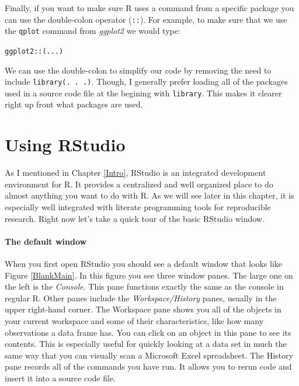 \documentclass[krantz1]{krantz}
\begin{document}
Finally, if you want to make sure R uses a command from a specific package you can use the double-colon operator (\verb|::|). For example, to make sure that we use the \texttt{qplot} command from \emph{ggplot2} we would type:

\begin{knitrout}
\color{fgcolor}\begin{kframe}
\begin{alltt}
ggplot2::(. . .)
\end{alltt}
\end{kframe}
\end{knitrout}


\noindent We can use the double-colon to simplify our code by removing the need to include \verb|library(. . .)|. Though, I generally prefer loading all of the packages used in a source code file at the begining with \texttt{library}. This makes it clearer right up front what packages are used.

\section{Using RStudio}

As I mentioned in Chapter \ref{Intro}, RStudio is an integrated development environment for R. It provides a centralized and well organized place to do almost anything you want to do with R. As we will see later in this chapter, it is especially well integrated with literate programming tools for reproducible research. Right now let's take a quick tour of the basic RStudio window.

\paragraph{The default window}

When you first open RStudio you should see a default window that looks like Figure \ref{BlankMain}. In this figure you see three window panes. The large one on the left is the {\emph{Console}}. This pane functions exactly the same as the console in regular R. Other panes include the {\emph{Workspace/History}} panes, usually in the upper right-hand corner. The Workspace pane shows you all of the objects in your current workspace and some of their characteristics, like how many observations a data frame has. You can click on an object in this pane to see its contents. This is especially useful for quickly looking at a data set in much the same way that you can visually scan a Microsoft Excel spreadsheet. The History pane records all of the commands you have run. It allows you to rerun code and insert it into a source code file.
\end{document}

